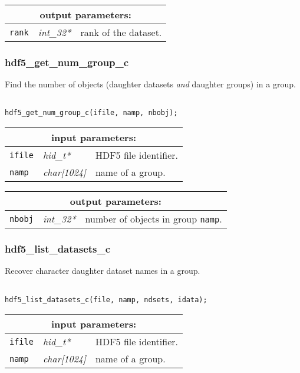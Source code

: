 \vskip 0.8cm

\noindent
\begin{tabular}{|p{1.5cm}|p{2cm}|p{11cm}|}
\hline
\multicolumn{3}{|c|}{\bf output parameters:} \\
\hline
{\tt rank} & {\it int\_32*} & rank of the dataset. \\
\hline
\end{tabular}

\subsubsection{hdf5\_get\_num\_group\_c}

Find the number of objects (daughter datasets {\sl and} daughter groups) in a group.

\begin{verbatim}

hdf5_get_num_group_c(ifile, namp, nbobj);
\end{verbatim}

\noindent
\begin{tabular}{|p{1.5cm}|p{2cm}|p{11cm}|}
\hline
\multicolumn{3}{|c|}{\bf input parameters:} \\
\hline
{\tt ifile} & {\it hid\_t*} & HDF5 file identifier. \\
\hline
{\tt namp} & {\it char[1024]} & name of a group. \\
\hline
\end{tabular}

\vskip 0.8cm

\noindent
\begin{tabular}{|p{1.5cm}|p{2cm}|p{11cm}|}
\hline
\multicolumn{3}{|c|}{\bf output parameters:} \\
\hline
{\tt nbobj} & {\it int\_32*} & number of objects in group {\tt namp}. \\
\hline
\end{tabular}

\subsubsection{hdf5\_list\_datasets\_c}

Recover character daughter dataset names in a group.

\begin{verbatim}

hdf5_list_datasets_c(file, namp, ndsets, idata);
\end{verbatim}

\noindent
\begin{tabular}{|p{1.5cm}|p{2cm}|p{11cm}|}
\hline
\multicolumn{3}{|c|}{\bf input parameters:} \\
\hline
{\tt ifile} & {\it hid\_t*} & HDF5 file identifier. \\
\hline
{\tt namp} & {\it char[1024]} & name of a group. \\
\hline
\end{tabular}

